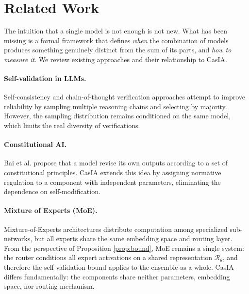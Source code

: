 \documentclass[11pt,a4paper]{article}
\theoremstyle{remark}
\begin{document}
\section{Related Work}
\label{sec:related}

The intuition that a single model is not enough is not new. What has been missing is a formal framework that defines \emph{when} the combination of models produces something genuinely distinct from the sum of its parts, and \emph{how to measure it}. We review existing approaches and their relationship to CasIA.

\paragraph{Self-validation in LLMs.}
Self-consistency \cite{wang2023selfconsistency} and chain-of-thought verification \cite{weng2023verification} approaches attempt to improve reliability by sampling multiple reasoning chains and selecting by majority. However, the sampling distribution remains conditioned on the same model, which limits the real diversity of verifications.

\paragraph{Constitutional AI.}
Bai et al. \cite{bai2022constitutional} propose that a model revise its own outputs according to a set of constitutional principles. CasIA extends this idea by assigning normative regulation to a component with independent parameters, eliminating the dependence on self-modification.

\paragraph{Mixture of Experts (MoE).}
Mixture-of-Experts architectures \cite{shazeer2017moe,fedus2022switch} distribute computation among specialized sub-networks, but all experts share the same embedding space and routing layer. From the perspective of Proposition \ref{prop:bound}, MoE remains a single system: the router conditions all expert activations on a shared representation $\mathcal{R}_\theta$, and therefore the self-validation bound applies to the ensemble as a whole. CasIA differs fundamentally: the components share neither parameters, embedding space, nor routing mechanism.
\end{document}
